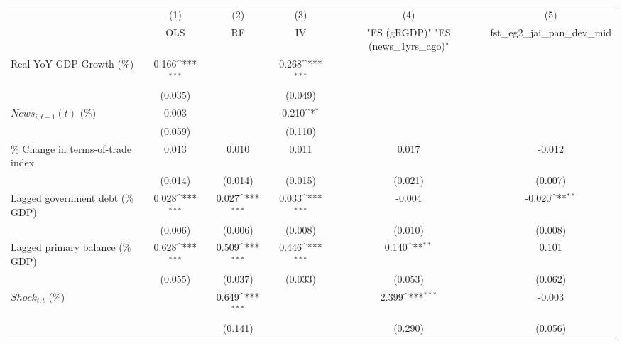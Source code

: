 {
\def\sym#1{\ifmmode^{#1}\else\(^{#1}\)\fi}
\begin{tabular}{l*{5}{c}}
\toprule
                    &\multicolumn{1}{c}{(1)}&\multicolumn{1}{c}{(2)}&\multicolumn{1}{c}{(3)}&\multicolumn{1}{c}{(4)}&\multicolumn{1}{c}{(5)}\\
                    &\multicolumn{1}{c}{OLS}&\multicolumn{1}{c}{RF}&\multicolumn{1}{c}{IV}&\multicolumn{1}{c}{ "FS (gRGDP)"  "FS (news_1yrs_ago)" }&\multicolumn{1}{c}{fst_eg2_jai_pan_dev_mid}\\
\midrule
Real YoY GDP Growth (\%)&       0.166\sym{***}&                     &       0.268\sym{***}&                     &                     \\
                    &     (0.035)         &                     &     (0.049)         &                     &                     \\
\addlinespace
$ News_{i,t-1}(t)$ (\%)&       0.003         &                     &       0.210\sym{*}  &                     &                     \\
                    &     (0.059)         &                     &     (0.110)         &                     &                     \\
\addlinespace
\% Change in terms-of-trade index&       0.013         &       0.010         &       0.011         &       0.017         &      -0.012         \\
                    &     (0.014)         &     (0.014)         &     (0.015)         &     (0.021)         &     (0.007)         \\
\addlinespace
Lagged government debt (\% GDP)&       0.028\sym{***}&       0.027\sym{***}&       0.033\sym{***}&      -0.004         &      -0.020\sym{**} \\
                    &     (0.006)         &     (0.006)         &     (0.008)         &     (0.010)         &     (0.008)         \\
\addlinespace
Lagged primary balance (\% GDP)&       0.628\sym{***}&       0.509\sym{***}&       0.446\sym{***}&       0.140\sym{**} &       0.101         \\
                    &     (0.055)         &     (0.037)         &     (0.033)         &     (0.053)         &     (0.062)         \\
\addlinespace
$ Shock_{i,t}$ (\%) &                     &       0.649\sym{***}&                     &       2.399\sym{***}&      -0.003         \\
                    &                     &     (0.141)         &                     &     (0.290)         &     (0.056)         \\

\end{tabular}}
